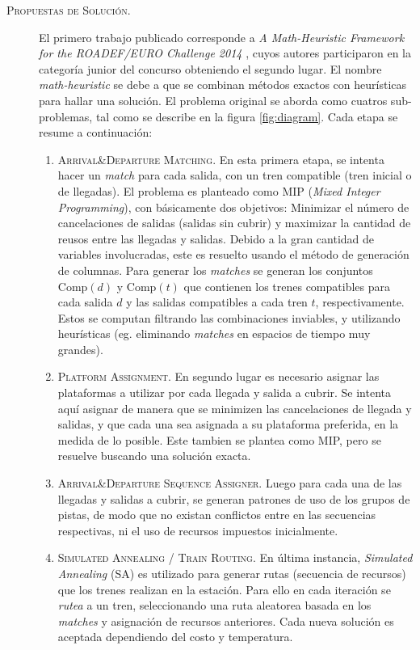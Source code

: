 \documentclass[letter, 10pt]{article}
\begin{document}
\begin{description}
	\item[\textsc{Propuestas de Solución.}]
	El primero trabajo publicado corresponde a \textit{A Math-Heuristic Framework for the ROADEF/EURO Challenge 2014} \cite{MathHeuristic}, cuyos autores participaron en la categoría junior del concurso obteniendo el segundo lugar. El nombre \textit{math-heuristic} se debe a que se combinan métodos exactos con heurísticas para hallar una solución. El problema original se aborda como cuatros sub-problemas, tal como se describe en la figura \ref{fig:diagram}. Cada etapa se resume a continuación:
	\begin{enumerate}
		\item \textsc{Arrival\&Departure Matching}. En esta primera etapa, se intenta hacer un \textit{match} para cada salida, con un tren compatible (tren inicial o de llegadas). El problema es planteado como MIP (\textit{Mixed Integer Programming}), con básicamente dos objetivos: Minimizar el número de cancelaciones de salidas (salidas sin cubrir) y maximizar la cantidad de reusos entre las llegadas y salidas. Debido a la gran cantidad de variables involucradas, este es resuelto usando el método de generación de columnas. Para generar los \textit{matches} se generan los conjuntos $\text{Comp}(d)$ y $\text{Comp}(t)$ que contienen los trenes compatibles para cada salida $d$ y las salidas compatibles a cada tren $t$, respectivamente. Estos se computan filtrando las combinaciones inviables, y utilizando heurísticas (eg. eliminando \textit{matches} en espacios de tiempo muy grandes). 
		\item \textsc{Platform Assignment}. En segundo lugar es necesario asignar las plataformas a utilizar por cada llegada y salida a cubrir. Se intenta aquí asignar de manera que se minimizen las cancelaciones de llegada y salidas, y que cada una sea asignada a su plataforma preferida, en la medida de lo posible. Este tambien se plantea como MIP, pero se resuelve buscando una solución exacta.
		\item \textsc{Arrival\&Departure Sequence Assigner}. Luego para cada una de las llegadas y salidas a cubrir, se generan patrones de uso de los grupos de pistas, de modo que no existan conflictos entre en las secuencias respectivas, ni el uso de recursos impuestos inicialmente. 
		\item \textsc{Simulated Annealing / Train Routing}. En última instancia, \textit{Simulated Annealing} (SA) es utilizado para generar rutas (secuencia de recursos) que los trenes realizan en la estación. Para ello en cada iteración se \textit{rutea} a un tren, seleccionando una ruta aleatorea basada en los \textit{matches} y asignación de recursos anteriores. Cada nueva solución es aceptada dependiendo del costo y temperatura.

\end{enumerate}
\end{description}
\end{document}
